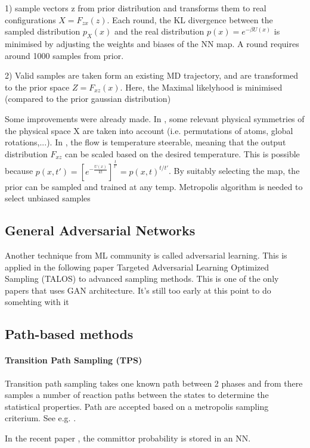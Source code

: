\documentclass{article}
\begin{document}
1) sample vectors z from prior distribution and transforms them to real configurations $X=F_{zx}(z)$. Each round, the KL divergence between the sampled distribution $p_{X}(x)$ and the real distribution $p(x)=e^{-\beta U(x)}$ is minimised by adjusting the weights and biases of the NN map. A round requires around 1000 samples from prior.

2) Valid samples are taken form an existing MD trajectory, and are transformed to the prior space $Z = F_{xz}(x)$. Here, the Maximal likelyhood is minimised (compared to the prior gaussian distribution)

Some improvements were already made. In \cite{kohler2019}, some relevant physical symmetries of the physical space X are taken into account (i.e. permutations of atoms, global rotations,...). In \cite{Dibak2021}, the flow is temperature steerable, meaning that the output distribution $F_{xz}$ can be scaled based on the desired temperature. This is possible because $p(x,t') = [e^{-\frac{U(x)}{k t} } ]^{\frac{t}{t'}} =  p(x,t)^{t/t'} $. By suitably selecting the map, the prior can be sampled and trained at any temp. Metropolis algorithm is needed to select unbiased samples

\subsection{ General Adversarial Networks}
Another technique from ML community is called adversarial learning. This is applied in the following paper Targeted Adversarial Learning Optimized Sampling (TALOS) \cite{Zhang2019} to advanced sampling methods. This is one of the only papers that uses GAN architecture. It's still too early at this point to do somehting with it

\subsection{Path-based methods}

\paragraph{Transition Path Sampling (TPS)}

Transition path sampling takes one known path between 2 phases and from there samples a number of reaction paths between the states to determine the statistical properties. Path are accepted based on a metropolis sampling criterium. See e.g. \cite{Dellago1998}.

In the recent paper \cite{Jung2019}, the committor probability is stored in an NN.
\end{document}
